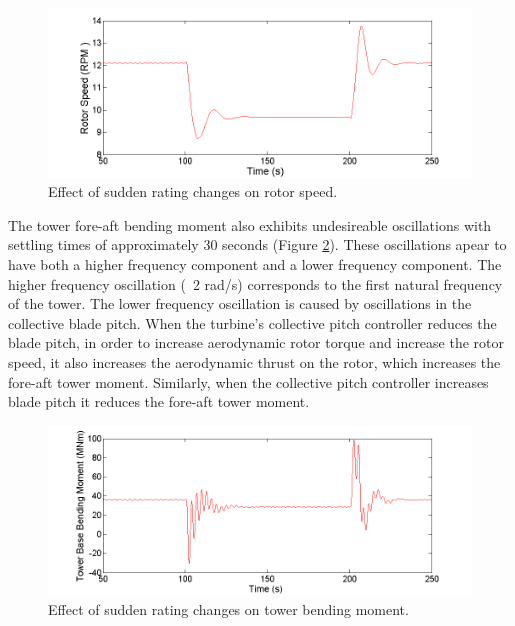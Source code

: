 \begin{figure}[htbp]
	\centering
		\includegraphics[trim = {1cm 0 2cm 0}, clip, width = \linewidth]{Figures/ch4Figures/fig4-10.png}
		
	\caption{Effect of sudden rating changes on rotor speed.}
	\label{fig4-10}
\end{figure}

The tower fore-aft bending moment also exhibits undesireable oscillations with settling times of approximately 30 seconds (Figure \ref{fig4-11}). These oscillations apear to have both a higher frequency component and a lower frequency component. The higher frequency oscillation (~2 rad/s) corresponds to the first natural frequency of the tower. The lower frequency oscillation is caused by oscillations in the collective blade pitch. When the turbine's collective pitch controller reduces the blade pitch, in order to increase aerodynamic rotor torque and increase the rotor speed, it also increases the aerodynamic thrust on the rotor, which increases the fore-aft tower moment. Similarly, when the collective pitch controller increases blade pitch it reduces the fore-aft tower moment. 

\begin{figure}[htbp]
	\centering
		\includegraphics[trim = {1cm 0 2cm 0}, clip, width = \linewidth]{Figures/ch4Figures/fig4-11.png}
		
	\caption{Effect of sudden rating changes on tower bending moment.}
	\label{fig4-11}
\end{figure}

